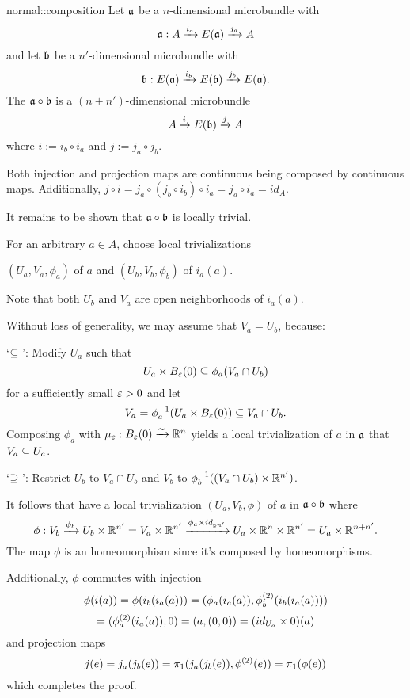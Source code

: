 \begin{mydefinition}{normal::composition}
    Let $\ba$ be a $n$-dimensional microbundle with
    \[ \bundledef{\ba}{A}{E(\ba)}{i_a}{j_a} \]
    and let $\bb$ be a $n'$-dimensional microbundle with
    \[ \bundledef{\bb}{E(\ba)}{E(\bb)}{i_b}{j_b}. \]
    The  $\ba \circ \bb$ is a $(n + n')$-dimensional microbundle
    \[ \bundle{A}{E(\bb)}{i}{j} \]
    where $i := i_b \circ i_a$ and $j := j_a \circ j_b$.
\end{mydefinition}

\begin{myproof}
    Both injection and projection maps are continuous being composed by continuous maps.
    Additionally, $j \circ i = j_a \circ (j_b \circ i_b) \circ i_a = j_a \circ i_a = id_A$.

    It remains to be shown that $\ba \circ \bb$ is locally trivial.

    For an arbitrary $a \in A$, choose local trivializations
    \begin{center}
        $(U_a, V_a, \phi_a)$ of $a$ and $(U_b, V_b, \phi_b)$ of $i_a(a)$.
    \end{center}
    Note that both $U_b$ and $V_a$ are open neighborhoods of $i_a(a)$.
    
    Without loss of generality, we may assume that $V_a = U_b$, because:
    
    `$\sub$':
    Modify $U_a$ such that
    \[ U_a \times \ball[\eps] \sub \phi_a(V_a \cap U_b) \]
    for a sufficiently small $\eps > 0$ and let
    \[ V_a = \inv{\phi_a}(U_a \times \ball[\eps]) \sub V_a \cap U_b. \]
    Composing $\phi_a$ with $\mu_\eps: \ball[\eps] \isomto \R^n$
    yields a local trivialization of $a$ in $\ba$ that $V_a \sub U_a$.

    `$\bus$': Restrict $U_b$ to $V_a \cap U_b$ and $V_b$ to $\inv{\phi_b}((V_a \cap U_b) \times \R^{n'})$.

    It follows that have a local trivialization
    $(U_a, V_b, \phi)$ of $a$ in $\ba \circ \bb$ where
    \[ 
        \phi: V_b \xto{\phi_b} U_b \times \R^{n'}
        = V_a \times \R^{n'}
        \xto{\phi_a \times id_{\R^{n'}}} U_a \times \R^{n} \times \R^{n'}
        = U_a \times \R^{n + n'}.
    \]
    The map $\phi$ is an homeomorphism since it's composed by homeomorphisms.

    Additionally, $\phi$ commutes with injection
    \[ \phi(i(a)) = \phi(i_b(i_a(a))) = (\phi_a(i_a(a)), \snd{\phi_b}(i_b(i_a(a)))) \]
    \[ = (\snd{\phi_a}(i_a(a)), 0) = (a, (0, 0)) = (id_{U_a} \times 0)(a) \]
    and projection maps
    \[ j(e) = j_a(j_b(e)) = \pi_1(j_a(j_b(e)), \snd{\phi}(e)) = \pi_1(\phi(e)) \]
    which completes the proof.
\end{myproof}